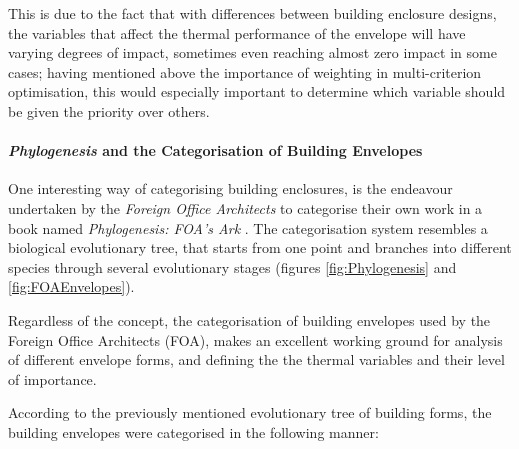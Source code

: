 This is due to the fact that with differences between building enclosure designs, the variables that affect the thermal performance of the envelope will have varying degrees of impact, sometimes even reaching almost zero impact in some cases; having mentioned above the importance of weighting in multi-criterion optimisation, this would especially important to determine which variable should be given the priority over others.

\paragraph{\emph{Phylogenesis} and the Categorisation of Building Envelopes}\mbox{}

One interesting way of categorising building enclosures, is the endeavour undertaken by the \emph{Foreign Office Architects} to categorise their own work in a book named \emph{Phylogenesis: FOA's Ark} \cite{foa04}. The categorisation system resembles a biological evolutionary tree, that starts from one point and branches into different species through several evolutionary stages (figures \ref{fig:Phylogenesis} and \ref{fig:FOAEnvelopes}).

Regardless of the concept, the categorisation of building envelopes used by the Foreign Office Architects (FOA), makes an excellent working ground for analysis of different envelope forms, and defining the the thermal variables and their level of importance.

According to the previously mentioned evolutionary tree of building forms, the building envelopes were categorised in the following manner:


